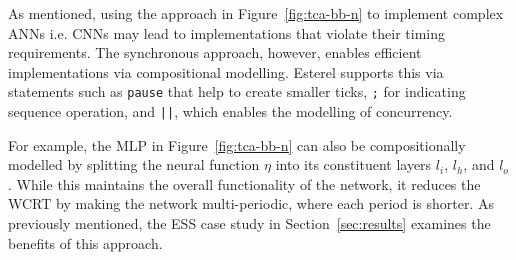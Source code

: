 

As mentioned, using the approach in Figure~\ref{fig:tca-bb-n} to implement complex \acp{ANN} i.e. \acp{CNN} may lead to implementations that violate their timing requirements. 
The synchronous approach, however, enables efficient implementations via compositional modelling.
Esterel supports this via statements such as \texttt{pause} that help to create smaller ticks, \texttt{;} for indicating sequence operation, and \texttt{||}, which enables the modelling of concurrency. 

For example, the \ac{MLP} in Figure~\ref{fig:tca-bb-n} can also be
compositionally modelled by splitting the neural function $\eta$
into its constituent layers $l_i$, $l_h$, and $l_o$. 
While this maintains the overall functionality of the network, it
reduces the \ac{WCRT} by making the network multi-periodic, where each
period is shorter. 
As previously mentioned, the \ac{ESS} case study in Section~\ref{sec:results} examines the benefits of this approach.


